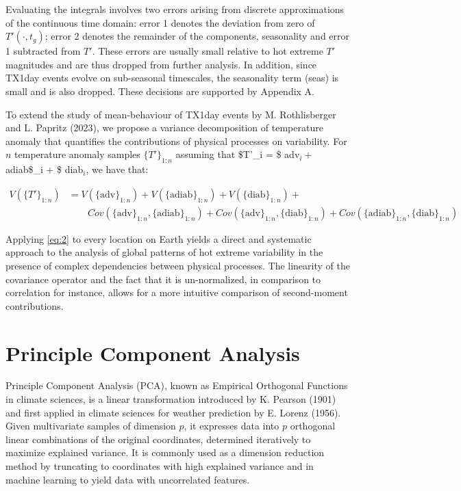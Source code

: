 \documentclass[11pt,a4paper,twoside,openright]{report}
\theoremstyle{definition}
\numberwithin{equation}{subsection}
\begin{document}
Evaluating the integrals involves two errors arising from discrete approximations of the continuous time domain: error 1 denotes the deviation from zero of \(T'(\cdot ,t_g)\); error 2 denotes the remainder of the components, seasonality and error 1 subtracted from \(T'\). These errors are usually small relative to hot extreme \(T'\) magnitudes and are thus dropped from further analysis. In addition, since TX1day events evolve on sub-seasonal timescales, the seasonality term (seas) is small and is also dropped. These decisions are supported by Appendix A.

To extend the study of mean-behaviour of TX1day events by M. Rothlisberger and L. Papritz (2023), we propose a variance decomposition of temperature anomaly that quantifies the contributions of physical processes on variability. For \(n\) temperature anomaly samples \(\{ T' \}_{1:n}\) assuming that \$T'\_i = \$ adv\(_i +\) adiab\$\_i + \$ diab\(_i\), we have that:

\begin{equation}
\label{eq:2}
 \begin{split}
   V(\{ T' \}_{1:n})  & = V(\{ \text{adv} \}_{1:n} ) + V(\{ \text{adiab} \}_{1:n} ) + V(\{ \text{diab} \}_{1:n} ) + \\
   & \qquad Cov(\{ \text{adv} \}_{1:n} ,\{ \text{adiab} \}_{1:n}) + Cov(\{ \text{adv} \}_{1:n},\{ \text{diab} \}_{1:n}) + Cov(\{ \text{adiab} \}_{1:n},\{ \text{diab} \}_{1:n})
\end{split}
\end{equation}

Applying \ref{eq:2} to every location on Earth yields a direct and systematic approach to the analysis of global patterns of hot extreme variability in the presence of complex dependencies between physical processes. The linearity of the covariance operator and the fact that it is un-normalized, in comparison to correlation for instance, allows for a more intuitive comparison of second-moment contributions.

\hypertarget{principle-component-analysis}{%
\section{Principle Component Analysis}\label{principle-component-analysis}}

Principle Component Analysis (PCA), known as Empirical Orthogonal Functions in climate sciences, is a linear transformation introduced by K. Pearson (1901) and first applied in climate sciences for weather prediction by E. Lorenz (1956). Given multivariate samples of dimension \(p\), it expresses data into \(p\) orthogonal linear combinations of the original coordinates, determined iteratively to maximize explained variance. It is commonly used as a dimension reduction method by truncating to coordinates with high explained variance and in machine learning to yield data with uncorrelated features.
\end{document}
